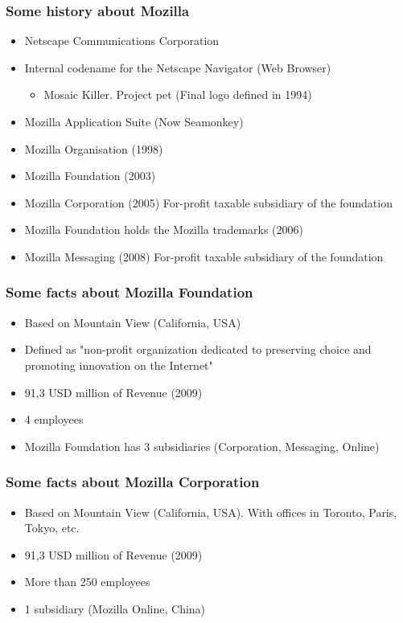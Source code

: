 \documentclass{beamer}
\begin{document}

\begin{frame}
\frametitle{Some history about Mozilla}
 \begin{itemize}
 \item Netscape Communications Corporation
 \item Internal codename for the Netscape Navigator (Web Browser)
    \begin{itemize}
    \item Mosaic Killer. Project pet (Final logo defined in 1994)
    \end{itemize}
 \item Mozilla Application Suite (Now Seamonkey)
 \item Mozilla Organisation (1998)
 \item Mozilla Foundation (2003)
 \item Mozilla Corporation (2005) For-profit taxable subsidiary of the foundation
 \item Mozilla Foundation holds the Mozilla trademarks (2006)
 \item Mozilla Messaging (2008) For-profit taxable subsidiary of the foundation
 \end{itemize}
\end{frame}


\begin{frame}
\frametitle{Some facts about Mozilla Foundation}
 \begin{itemize}
 \item Based on Mountain View (California, USA)
 \item Defined as "non-profit organization dedicated to preserving choice and promoting innovation on the Internet"
 \item 91,3 USD million of Revenue (2009) 
 \item 4 employees
 \item Mozilla Foundation has 3 subsidiaries (Corporation, Messaging, Online)
 \end{itemize}
\end{frame}


\begin{frame}
\frametitle{Some facts about Mozilla Corporation}
 \begin{itemize}
 \item Based on Mountain View (California, USA). With offices in Toronto, Paris, Tokyo, etc.
 \item 91,3 USD million of Revenue (2009) 
 \item More than 250 employees
 \item 1 subsidiary (Mozilla Online, China)
 \end{itemize}
\end{frame}
\end{document}

